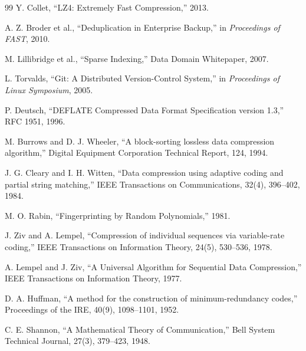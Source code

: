 \documentclass[10pt,conference]{IEEEtran}
\begin{document}
\begin{thebibliography}{99}
 Y. Collet, ``LZ4: Extremely Fast Compression,'' 2013.

 A. Z. Broder et al., ``Deduplication in Enterprise Backup,'' in \textit{Proceedings of FAST}, 2010.

 M. Lillibridge et al., ``Sparse Indexing,'' Data Domain Whitepaper, 2007.

 L. Torvalds, ``Git: A Distributed Version-Control System,'' in \textit{Proceedings of Linux Symposium}, 2005.

 P. Deutsch, ``DEFLATE Compressed Data Format Specification version 1.3,'' RFC 1951, 1996.

 M. Burrows and D. J. Wheeler, ``A block-sorting lossless data compression algorithm,'' Digital Equipment Corporation Technical Report, 124, 1994.

 J. G. Cleary and I. H. Witten, ``Data compression using adaptive coding and partial string matching,'' IEEE Transactions on Communications, 32(4), 396--402, 1984.

 M. O. Rabin, ``Fingerprinting by Random Polynomials,'' 1981.

 J. Ziv and A. Lempel, ``Compression of individual sequences via variable-rate coding,'' IEEE Transactions on Information Theory, 24(5), 530--536, 1978.

 A. Lempel and J. Ziv, ``A Universal Algorithm for Sequential Data Compression,'' IEEE Transactions on Information Theory, 1977.

 D. A. Huffman, ``A method for the construction of minimum-redundancy codes,'' Proceedings of the IRE, 40(9), 1098--1101, 1952.

 C. E. Shannon, ``A Mathematical Theory of Communication,'' Bell System Technical Journal, 27(3), 379--423, 1948.

\end{thebibliography}
\end{document}
